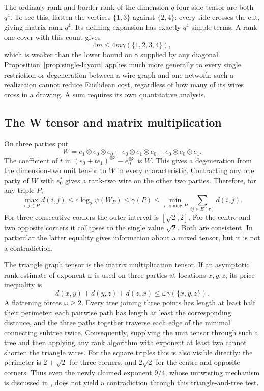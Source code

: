 The ordinary rank and border rank of the dimension-$q$ four-side tensor are both $q^4$. To see this, flatten the vertices $\{1,3\}$ against $\{2,4\}$: every side crosses the cut, giving matrix rank $q^4$. Its defining expansion has exactly $q^4$ simple terms. A rank-one cover with this count gives
\[
 4m\leq4m\gamma(\{1,2,3,4\}),
\]
which is weaker than the lower bound on $\gamma$ supplied by any diagonal. Proposition~\ref{prop:single-layout} applies much more generally to every single restriction or degeneration between a wire graph and one network: such a realization cannot reduce Euclidean cost, regardless of how many of its wires cross in a drawing. A sum requires its own quantitative analysis.

\subsection{The W tensor and matrix multiplication}
On three parties put
\[
 W=e_1\otimes e_0\otimes e_0+
 e_0\otimes e_1\otimes e_0+
 e_0\otimes e_0\otimes e_1.
\]
The coefficient of $t$ in $(e_0+te_1)^{\otimes3}-e_0^{\otimes3}$ is $W$. This gives a degeneration from the dimension-two unit tensor to $W$ in every characteristic. Contracting any one party of $W$ with $e_0^*$ gives a rank-two wire on the other two parties. Therefore, for any triple $P$,
\begin{equation}\label{eq:w-price-test}
 \max_{i,j\in P}d(i,j)
 \leq c\log_2\psi(W_P)
 \leq\gamma(P)
 \leq\min_{\tau\text{ joining }P}\sum_{ij\in E(\tau)}d(i,j).
\end{equation}
For three consecutive corners the outer interval is $[\sqrt2,2]$. For the centre and two opposite corners it collapses to the single value $\sqrt2$. Both are consistent. In particular the latter equality gives information about a mixed tensor, but it is not a contradiction.

The triangle graph tensor is the matrix multiplication tensor. If an asymptotic rank estimate of exponent $\omega$ is used on three parties at locations $x,y,z$, its price inequality is
\begin{equation}\label{eq:mm-price-test}
 d(x,y)+d(y,z)+d(z,x)\leq\omega\gamma(\{x,y,z\}).
\end{equation}
A flattening forces $\omega\geq2$. Every tree joining three points has length at least half their perimeter: each pairwise path has length at least the corresponding distance, and the three paths together traverse each edge of the minimal connecting subtree twice. Consequently, supplying the unit tensor through such a tree and then applying any rank algorithm with exponent at least two cannot shorten the triangle wires. For the square triples this is also visible directly: the perimeter is $2+\sqrt2$ for three corners, and $2\sqrt2$ for the centre and opposite corners. Thus even the newly claimed exponent $9/4$, whose untwisting mechanism is discussed in \cite[Sections 2--3]{Li2026}, does not yield a contradiction through this triangle-and-tree test.

